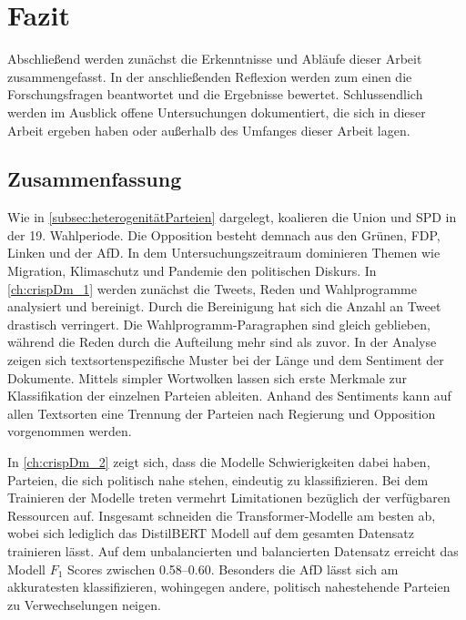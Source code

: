 
\chapter{Fazit} \label{ch:conclusion}

Abschließend werden zunächst die Erkenntnisse und Abläufe dieser Arbeit zusammengefasst. In der anschließenden Reflexion werden zum einen die Forschungsfragen beantwortet und die Ergebnisse bewertet. Schlussendlich werden im Ausblick offene Untersuchungen dokumentiert, die sich in dieser Arbeit ergeben haben oder außerhalb des Umfanges dieser Arbeit lagen.

\section{Zusammenfassung}

Wie in \autoref{subsec:heterogenitätParteien} dargelegt, koalieren die Union und \ac{SPD} in der \num{19}. Wahlperiode. Die Opposition besteht demnach aus den Grünen, \ac{FDP}, Linken und der \ac{AfD}. In dem Untersuchungszeitraum dominieren Themen wie Migration, Klimaschutz und Pandemie den politischen Diskurs. In \autoref{ch:crispDm_1} werden zunächst die Tweets, Reden und Wahlprogramme analysiert und bereinigt. Durch die Bereinigung hat sich die Anzahl an Tweet drastisch verringert. Die Wahlprogramm-Paragraphen sind gleich geblieben, während die Reden durch die Aufteilung mehr sind als zuvor. In der Analyse zeigen sich textsortenspezifische Muster bei der Länge und dem Sentiment der Dokumente. Mittels simpler Wortwolken lassen sich erste Merkmale zur Klassifikation der einzelnen Parteien ableiten. Anhand des Sentiments kann auf allen Textsorten eine Trennung der Parteien nach Regierung und Opposition vorgenommen werden.

In \autoref{ch:crispDm_2} zeigt sich, dass die Modelle Schwierigkeiten dabei haben, Parteien, die sich politisch nahe stehen, eindeutig zu klassifizieren. Bei dem Trainieren der Modelle treten vermehrt Limitationen bezüglich der verfügbaren Ressourcen auf. Insgesamt schneiden die Transformer-Modelle am besten ab, wobei sich lediglich das DistilBERT Modell auf dem gesamten Datensatz trainieren lässt. Auf dem unbalancierten und balancierten Datensatz erreicht das Modell \(F_1\) Scores zwischen \numrange{0.58}{0.60}. Besonders die \ac{AfD} lässt sich am akkuratesten klassifizieren, wohingegen andere, politisch nahestehende Parteien zu Verwechselungen neigen.

